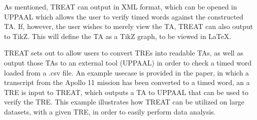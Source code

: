 As mentioned, TREAT can output in XML format, which can be opened in UPPAAL which allows the user to verify timed words against the constructed TA. If, however, the user wishes to merely view the TA, TREAT can also output to TikZ. This will define the TA as a TikZ graph, to be viewed in LaTeX.

TREAT sets out to allow users to convert TREs into readable TAs, as well as output those TAs to an external tool (UPPAAL) in order to check a timed word loaded from a .csv file.
An example usecase is provided in the paper, in which a transcript from the Apollo 11 mission has been converted to a timed word, an a TRE is input to TREAT, which outputs a TA to UPPAAL that can be used to verify the TRE. This example illustrates how TREAT can be utilized on large datasets, with a given TRE, in order to easily perform data analysis.
